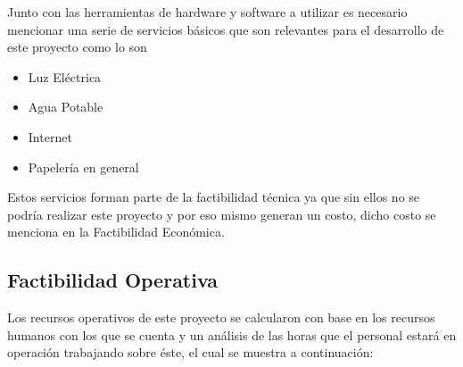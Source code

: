\documentclass[12pt, a4paper, titlepage]{report}
\begin{document}
    		Junto con las herramientas de hardware y software a utilizar es necesario mencionar una serie de servicios b\'asicos que son relevantes para el desarrollo de este proyecto como lo son 
    		\begin{itemize}
    		    \item Luz Eléctrica
    		    \item Agua Potable
    		    \item Internet
    		    \item Papelería en general
    		\end{itemize}
    		Estos servicios forman parte de la factibilidad técnica ya que sin ellos no se podría realizar este proyecto y por eso mismo generan un costo, dicho costo se menciona en la Factibilidad Económica.
    		
    	    \subsection{Factibilidad Operativa}
    	    Los recursos operativos de este proyecto se calcularon con base en los recursos humanos con los que se cuenta y un análisis de las horas que el personal estará en operación trabajando sobre éste, el cual se muestra a continuación:
    	    
\end{document}
